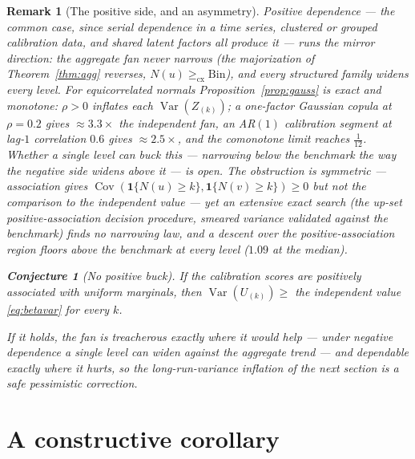 \documentclass[11pt]{article}
\newtheorem{conjecture}{Conjecture}
\newtheorem{remark}{Remark}
\begin{document}
\begin{remark}[The positive side, and an asymmetry]
Positive dependence --- the common case, since serial dependence in a time series, clustered or grouped
calibration data, and shared latent factors all produce it --- runs the mirror direction: the aggregate
fan never \emph{narrows} (the majorization of Theorem~\ref{thm:agg} reverses, $N(u)\ge_{\mathrm{cx}}
\mathrm{Bin}$), and every structured family widens \emph{every} level. For equicorrelated normals
Proposition~\ref{prop:gauss} is exact and monotone: $\rho>0$ inflates each $\operatorname{Var}(Z_{(k)})$;
a one-factor Gaussian copula at $\rho=0.2$ gives $\approx 3.3\times$ the independent fan, an AR$(1)$
calibration segment at lag-$1$ correlation $0.6$ gives $\approx 2.5\times$, and the comonotone limit
reaches $\tfrac1{12}$. Whether a single level can buck this --- narrowing below the benchmark the way
the negative side widens above it --- is open. The obstruction is symmetric --- association gives
$\operatorname{Cov}(\mathbf 1\{N(u)\ge k\},\mathbf 1\{N(v)\ge k\})\ge0$ but not the comparison to the
independent value --- yet an extensive exact search (the up-set positive-association decision procedure,
smeared variance validated against the benchmark) finds \emph{no} narrowing law, and a descent over the
positive-association region floors above the benchmark at every level ($1.09$ at the median).
\begin{conjecture}[No positive buck]\label{conj:posmono}
If the calibration scores are positively associated with uniform marginals, then
$\operatorname{Var}(U_{(k)})\ge$ the independent value \eqref{eq:betavar} for every $k$.
\end{conjecture}
\noindent If it holds, the fan is treacherous exactly where it would help --- under negative dependence a
single level can widen against the aggregate trend --- and dependable exactly where it hurts, so the
long-run-variance inflation of the next section is a \emph{safe} pessimistic correction.
\end{remark}

\section{A constructive corollary}
\end{document}
